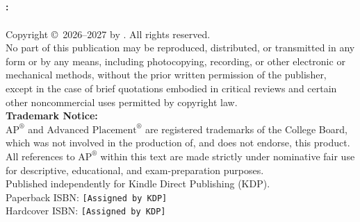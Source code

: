 
\thispagestyle{empty}
\begin{center}
  \vspace*{2cm}
  {\Huge\bfseries\color{MidnightBlue} \BookTitle}\\[12pt]
  {\Large\color{DarkSlateGray} \BookSubtitle}\\[24pt]
  {\large\bfseries \BookSeries}\\[36pt]
  {\Large \BookAuthor}\\[24pt]
  {\normalsize \Edition}
\end{center}
\clearpage

\thispagestyle{empty}
\vspace*{\fill}
\begin{center}
  \begin{minipage}{0.9\linewidth}
    \small
    \textbf{\BookTitle: \BookSubtitle}\\
    \BookSeries\\[6pt]
    Copyright \copyright\ 2026--2027 by \BookAuthor. All rights reserved.\\[10pt]
    No part of this publication may be reproduced, distributed, or transmitted in any form or by any means, including photocopying, recording, or other electronic or mechanical methods, without the prior written permission of the publisher, except in the case of brief quotations embodied in critical reviews and certain other noncommercial uses permitted by copyright law.\\[10pt]
    \textbf{Trademark Notice:}\\
    $\text{AP}^\circledR$ and $\text{Advanced Placement}^\circledR$ are registered trademarks of the College Board, which was not involved in the production of, and does not endorse, this product. All references to $\text{AP}^\circledR$ within this text are made strictly under nominative fair use for descriptive, educational, and exam-preparation purposes.\\[10pt]
    Published independently for Kindle Direct Publishing (KDP).\\
    Paperback ISBN: \texttt{[Assigned by KDP]}\\
    Hardcover ISBN: \texttt{[Assigned by KDP]}\\
  \end{minipage}
\end{center}
\vspace*{\fill}
\clearpage

